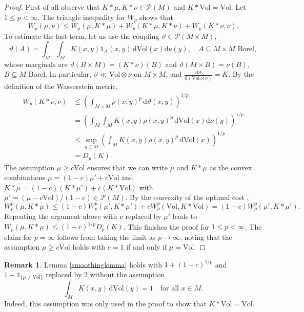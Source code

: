 \documentclass[11pt,a4paper]{article}
\theoremstyle{definition}
\newtheorem{remark}{Remark}
\begin{document}
\begin{proof} First of all observe that $K*\mu, K*\nu \in \mathcal{P}(M)$ and $K*\mathrm{Vol}=\mathrm{Vol}$. Let $1 \le p < \infty$. The triangle inequality for $W_p$ shows that
\[ W_p (\mu, \nu) \le W_p (\mu, K*\mu) + W_p (K*\mu, K*\nu) + W_p (K*\nu, \nu) . \]
To estimate the last term, let us use the coupling $\vartheta \in \mathcal{P}(M \times M)$,
\[ \vartheta (A) = \int_M \int_M K(x,y) \mathds{1}_A (x,y) \, \mathrm{d}\mathrm{Vol}(x) \mathrm{d}\nu (y), \quad A \subseteq M \times M \textrm{ Borel}, \]
whose marginals are $\vartheta (B \times M) = (K*\nu) (B)$ and $\vartheta (M \times B) = \nu(B)$, $B \subseteq M$ Borel. In particular, $\vartheta \ll \mathrm{Vol} \otimes \nu$ on $M \times M$, and $\frac{\mathrm{d}\vartheta}{\mathrm{d}(\mathrm{Vol} \otimes \nu)}=K$. By the definition of the Wasserstein metric,
\[ \begin{split} W_p (K*\nu, \nu) &\le \left( \int_{M \times M} \rho(x,y)^p \, \mathrm{d}\vartheta (x,y) \right)^{1/p} \\ &= \left( \int_M \int_M K(x,y) \rho(x,y)^p \, \mathrm{d} \mathrm{Vol}(x) \mathrm{d}\nu (y) \right)^{1/p} \\ &\le \sup_{y \in M} \left( \int_M K(x,y) \rho(x,y)^p \, \mathrm{d} \mathrm{Vol}(x) \right)^{1/p} \\ &= D_p (K) . \end{split} \]
The assumption $\mu \ge c \mathrm{Vol}$ ensures that we can write $\mu$ and $K*\mu$ as the convex combinations $\mu=(1-c) \mu' + c \mathrm{Vol}$ and $K*\mu = (1-c) (K*\mu') + c (K* \mathrm{Vol})$ with $\mu'=(\mu - c \mathrm{Vol})/(1-c) \in \mathcal{P}(M)$. By the convexity of the optimal cost \cite[p.\ 59]{VI},
\[ W_p^p (\mu, K*\mu) \le (1-c) W_p^p (\mu', K*\mu') + c W_p^p (\mathrm{Vol}, K*\mathrm{Vol}) = (1-c) W_p^p (\mu', K*\mu') .  \]
Repeating the argument above with $\nu$ replaced by $\mu'$ leads to $W_p (\mu, K*\mu) \le (1-c)^{1/p} D_p (K)$. This finishes the proof for $1 \le p < \infty$. The claim for $p=\infty$ follows from taking the limit as $p\to \infty$, noting that the assumption $\mu \ge c \mathrm{Vol}$ holds with $c=1$ if and only if $\mu = \mathrm{Vol}$.
\end{proof}

\begin{remark} Lemma \ref{smoothinglemma} holds with $1+(1-c)^{1/p}$ and $1+\mathds{1}_{\{ \mu \neq \mathrm{Vol} \}}$ replaced by $2$ without the assumption
\[ \int_M K(x,y) \, \mathrm{d} \mathrm{Vol}(y) =1 \quad \textrm{for all } x \in M. \]
Indeed, this assumption was only used in the proof to show that $K*\mathrm{Vol}=\mathrm{Vol}$.
\end{remark}
\end{document}
